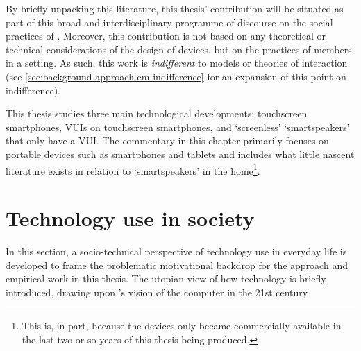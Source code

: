 By briefly unpacking this literature, this thesis' contribution will be situated as part of this broad and interdisciplinary programme of discourse on the social practices of .
Moreover, this contribution is not based on any theoretical or technical considerations of the design of devices, but on the practices of members in a setting.
As such, this work is \textit{indifferent} to models or theories of interaction (see \ref{sec:background approach em indifference} for an expansion of this point on indifference).

This thesis studies three main technological developments: touchscreen smartphones, \acfp{VUI} on touchscreen smartphones, and `screenless' `smartspeakers' that only have a \ac{VUI}.
The commentary in this chapter primarily focuses on portable devices such as smartphones and tablets and includes what little nascent literature exists in relation to `smartspeakers' in the home\footnote{This is, in part, because the devices only became commercially available in the last two or so years of this thesis being produced.}.






\section{Technology use in society}\label{sec:background litreview society}
In this section, a socio-technical perspective of technology use in everyday life is developed to frame the problematic motivational backdrop for the approach and empirical work in this thesis.
The utopian view of how technology is briefly introduced, drawing upon \citet{Weiser1991}'s vision of the computer in the 21st century



